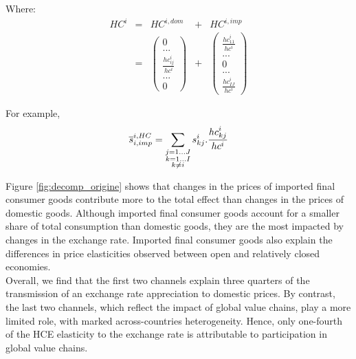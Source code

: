 \documentclass[12pt,a4paper]{paper}
\begin{document}
Where:
\begin{equation}
\begin{array}{ccccc}
HC^i&=&HC^{i,dom} & + &  HC^{i,imp} \\ 
&=&  \left( \begin{array}{c}
	0 \\
	...\\
	\frac{{hc}_{ij}^i}{hc^i}\\
	...\\
	0
	 \end{array}
	 \right)
&+&
\left( 	\begin{array}{c} \frac{{hc}_{11}^i}{hc^i} \\	...\\0\\...\\\frac{{hc}_{IJ}^i}{hc^i}\end{array}\right) 
\end{array}
\end{equation}

For example,
\begin{equation}
\overline{s}_{i,imp}^{i,HC} = \underset{\begin{subarray}{c}j=1 \dots J   \\ k=1 \dots I \\ k \neq i \end{subarray}}{\mathop \sum}\,{{s}_{kj}^i}.\frac{{hc}_{kj}^i}{hc^i}
\label{equ:share_of_imported}
 \end{equation}


Figure \ref{fig:decomp_origine} shows that changes in the prices of imported final consumer goods contribute more to the total effect than changes in the prices of domestic goods.
Although imported final consumer goods account for a smaller share of total consumption than domestic goods, they are the most impacted by changes in the exchange rate. 
Imported final consumer goods also explain the differences in price elasticities observed between open and relatively closed economies.\\

Overall, we find that the first two channels explain three quarters of the transmission of an exchange rate appreciation to domestic prices.
By contrast, the last two channels, which reflect the impact of global value chains, play a more limited role, with marked across-countries heterogeneity.
Hence, only one-fourth of the HCE elasticity to the exchange rate is attributable to participation in global value chains.\\
\end{document}
